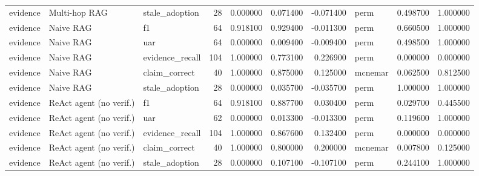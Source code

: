 \begin{table}
\begin{tabular}{lllrrrrlrr}
evidence & Multi-hop RAG & stale\_adoption & 28 & 0.000000 & 0.071400 & -0.071400 & perm & 0.498700 & 1.000000 \\
evidence & Naive RAG & f1 & 64 & 0.918100 & 0.929400 & -0.011300 & perm & 0.660500 & 1.000000 \\
evidence & Naive RAG & uar & 64 & 0.000000 & 0.009400 & -0.009400 & perm & 0.498500 & 1.000000 \\
evidence & Naive RAG & evidence\_recall & 104 & 1.000000 & 0.773100 & 0.226900 & perm & 0.000000 & 0.000000 \\
evidence & Naive RAG & claim\_correct & 40 & 1.000000 & 0.875000 & 0.125000 & mcnemar & 0.062500 & 0.812500 \\
evidence & Naive RAG & stale\_adoption & 28 & 0.000000 & 0.035700 & -0.035700 & perm & 1.000000 & 1.000000 \\
evidence & ReAct agent (no verif.) & f1 & 64 & 0.918100 & 0.887700 & 0.030400 & perm & 0.029700 & 0.445500 \\
evidence & ReAct agent (no verif.) & uar & 62 & 0.000000 & 0.013300 & -0.013300 & perm & 0.119600 & 1.000000 \\
evidence & ReAct agent (no verif.) & evidence\_recall & 104 & 1.000000 & 0.867600 & 0.132400 & perm & 0.000000 & 0.000000 \\
evidence & ReAct agent (no verif.) & claim\_correct & 40 & 1.000000 & 0.800000 & 0.200000 & mcnemar & 0.007800 & 0.125000 \\
evidence & ReAct agent (no verif.) & stale\_adoption & 28 & 0.000000 & 0.107100 & -0.107100 & perm & 0.244100 & 1.000000 \\
\bottomrule
\end{tabular}
\end{table}
